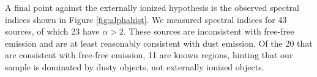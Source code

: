 \documentclass[twocolumn]{aastex61}
\begin{document}
A final point against the externally ionized hypothesis is the observed
spectral indices shown in Figure \ref{fig:alphahist}.  We measured spectral
indices for 43 sources, of which 23 have $\alpha>2$.  These sources are
inconsistent with free-free emission and are at least reasonably consistent
with dust emission.  Of the 20 that are consistent with free-free emission, 11
are known \hii regions, hinting that our sample is dominated by dusty objects,
not externally ionized objects.



% 
% 


%
\end{document}
